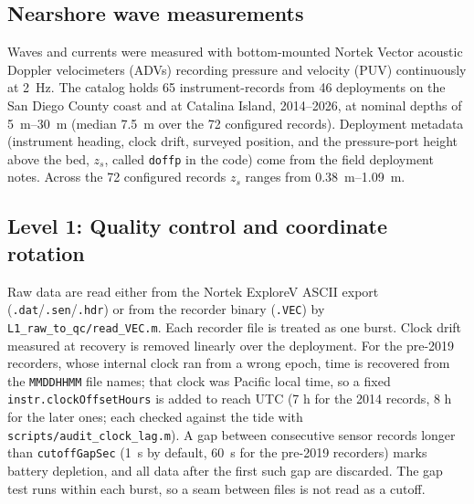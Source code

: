 
\subsection{Nearshore wave measurements}

Waves and currents were measured with bottom-mounted Nortek Vector acoustic
Doppler velocimeters (ADVs) recording pressure and velocity (PUV) continuously at
\SI{2}{\hertz}. The catalog holds 65 instrument-records from 46 deployments on the
San Diego County coast and at Catalina Island, 2014--2026, at nominal depths of
\SIrange{5}{30}{\meter} (median \SI{7.5}{\meter} over the 72 configured records).
Deployment metadata (instrument heading, clock drift, surveyed position, and the
pressure-port height above the bed, $z_s$, called \texttt{doffp} in the code)
come from the field deployment notes. Across the 72 configured records $z_s$
ranges from \SIrange{0.38}{1.09}{\meter}.


\subsection{Level 1: Quality control and coordinate rotation}

Raw data are read either from the Nortek ExploreV ASCII export
(\texttt{.dat}/\texttt{.sen}/\texttt{.hdr}) or from the recorder binary
(\texttt{.VEC}) by \texttt{L1\_raw\_to\_qc/read\_VEC.m}. Each recorder file is
treated as one burst. Clock drift measured at recovery is removed linearly over
the deployment. For the pre-2019 recorders, whose internal clock ran from a wrong
epoch, time is recovered from the \texttt{MMDDHHMM} file names; that clock was
Pacific local time, so a fixed \texttt{instr.clockOffsetHours} is added to
reach UTC (7 h for the 2014 records, 8 h for the later ones; each checked against
the tide with \texttt{scripts/audit\_clock\_lag.m}). A gap between consecutive sensor records longer than
\texttt{cutoffGapSec} (\SI{1}{\second} by default, \SI{60}{\second} for the
pre-2019 recorders) marks battery depletion, and all data after the first such
gap are discarded. The gap test runs within each burst, so a seam between files
is not read as a cutoff.

